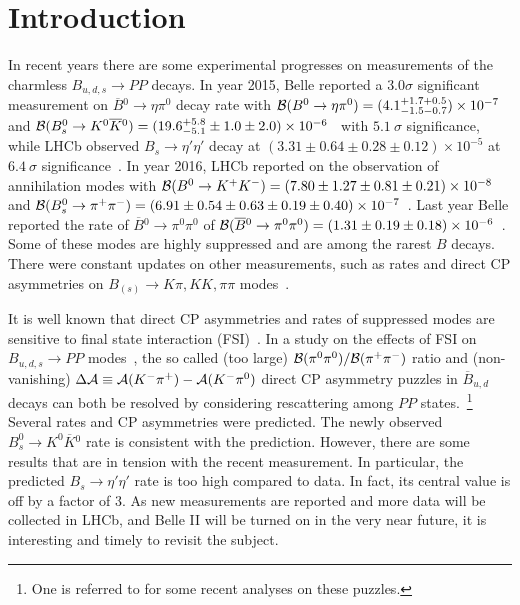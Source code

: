 \documentclass[aps,preprint,floats,epsf,epsfig,nofootinbib,letter]{revtex4}
\newcommand{\ov}{\overline}
\newcommand{\A}{{\cal A}}
\newcommand{\B}{{\cal B}}
\begin{document}
\pacs{11.30.Hv,  %
      13.25.Hw,  %
      14.40.Nd}  %

\maketitle






\section{Introduction}

In recent years there are some experimental progresses on measurements of the charmless $B_{u,d,s}\to PP$ decays.
In year 2015, Belle reported a $3.0\sigma$ significant measurement on $\ov B{}^0\to\eta\pi^0$ decay rate with
${\cal B}(B^0\to\eta\pi^0)=(4.1^{+1.7+0.5}_{-1.5-0.7})\times10^{-7}$~\cite{Pal:2015ewa}
and
${\cal B}(B_s^0\to K^0\ov K{}^0)=(19.6^{+5.8}_{-5.1}\pm 1.0\pm 2.0)\times 10^{-6}$~\cite{Pal:2015ghq} with $5.1~\sigma$ significance,
while LHCb observed $B_s\to\eta'\eta'$ decay at $(3.31\pm 0.64\pm 0.28\pm0.12)\times 10^{-5}$ at $6.4~\sigma$ significance~\cite{Aaij:2015qga}.
In year 2016, LHCb reported on the observation of annihilation modes with ${\cal B}(B^0\to K^+K^-)=(7.80\pm1.27\pm0.81\pm0.21)\times 10^{-8}$ and ${\cal B}(B^0_s\to\pi^+\pi^-)=(6.91\pm 0.54\pm0.63\pm0.19\pm0.40)\times 10^{-7}$~\cite{Aaij:2016elb}. 
Last year Belle reported the rate of $\overline B{}^0\to\pi^0\pi^0$ of ${\cal B}(\overline B{}^0\to\pi^0\pi^0)=(1.31\pm0.19\pm0.18)\times 10^{-6}$~\cite{Julius:2017jso}.
Some of these modes are highly suppressed and are among the rarest $B$ decays.
There were constant updates on other measurements, such as rates and  
direct CP asymmetries on $B_{(s)}\to K\pi, KK, \pi\pi$ modes~\cite{HFAG, PDG, Gershon}.


It is well known that direct CP asymmetries and rates of suppressed modes are sensitive to final state interaction (FSI)~\cite{Cheng:2004ru, Gronau}.
In a study on the effects of FSI on $B_{u,d,s}\to PP$ modes~\cite{Chua:2007cm}, 
the so called (too large) $\B(\pi^0\pi^0)/\B(\pi^+\pi^-)$ ratio and (non-vanishing) $\Delta\A\equiv\A(K^-\pi^+)-\A(K^-\pi^0)$ direct CP asymmetry puzzles in $\overline B_{u,d}$ decays can both be resolved by considering rescattering among $PP$ states.~\footnote{One is referred to \cite{Cheng:2014rfa,Kpi} for some recent analyses on these puzzles.} 
Several rates and CP asymmetries were predicted.
The newly observed $B_s^0\to K^0\ov K{}^0$ rate is consistent with the prediction.
However, there are some results that are in tension with the recent measurement. 
In particular, the predicted $B_s\to\eta'\eta'$ rate is too high compared to data. 
In fact, its central value is off by a factor of 3.
As new measurements are reported and more data will be collected in LHCb, and Belle II will be turned on in the very near future,
it is interesting and timely to revisit the subject.
\end{document}
